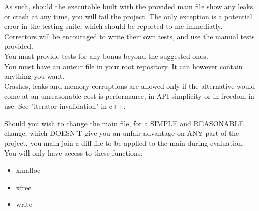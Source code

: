 \documentclass{42-en}
\begin{document}
    As such, should the executable built with the provided main file show any leaks,
    or crash at any time, you will fail the project. The only exception is a potential
    error in the testing suite, which should be reported to me immediatly.\\

    Correctors will be encouraged to write their own tests, and use the manual tests provided.\\

    You must provide tests for any bonus beyond the suggested ones.\\

    You must have an auteur file in your root repository. It can however contain anything you want.\\

    Crashes, leaks and memory corruptions are allowed only if the alternative would come at
    an unreasonable cost is performance, in API simplicity or in freedom in use. See "iterator
    invalidation" in c++.\\
    

    Should you wish to change the main file, for a SIMPLE and REASONABLE change,
    which DOESN'T give you an unfair advantage on ANY part of the project, you main join a diff
    file to be applied to the main during evaluation.\\

    You will only have access to these functions:\\
    \begin{itemize}\itemsep7pt
        \item xmalloc
        \item xfree
        \item write
    \end{itemize}
    

\end{document}
